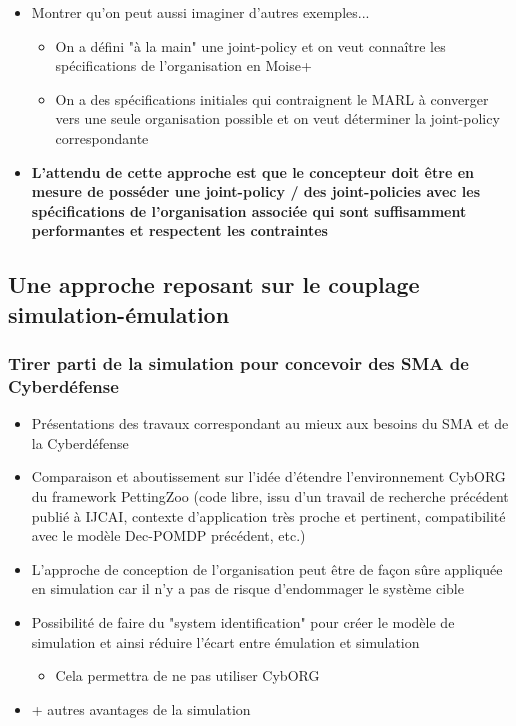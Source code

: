 \begin{itemize}
\begin{itemize}
\begin{itemize}
                    \end{itemize}
          \end{itemize}
    \item Montrer qu'on peut aussi imaginer d'autres exemples...
          \begin{itemize}
              \item On a défini "à la main" une joint-policy et on veut connaître les spécifications de l'organisation en Moise+
              \item On a des spécifications initiales qui contraignent le MARL à converger vers une seule organisation possible et on veut déterminer la joint-policy correspondante
          \end{itemize}
    \item \textbf{L'attendu de cette approche est que le concepteur doit être en mesure de posséder une joint-policy / des joint-policies avec les spécifications de l'organisation associée qui sont suffisamment performantes et respectent les contraintes}
\end{itemize}

\subsection{Une approche reposant sur le couplage simulation-émulation}

\subsubsection{Tirer parti de la simulation pour concevoir des SMA de Cyberdéfense}
\begin{itemize}

    \item Présentations des travaux correspondant au mieux aux besoins du SMA et de la Cyberdéfense
    \item Comparaison et aboutissement sur l'idée d'étendre l'environnement CybORG du framework PettingZoo (code libre, issu d'un travail de recherche précédent publié à IJCAI, contexte d'application très proche et pertinent, compatibilité avec le modèle Dec-POMDP précédent, etc.)
    \item L'approche de conception de l'organisation peut être de façon sûre appliquée en simulation car il n'y a pas de risque d'endommager le système cible
    \item Possibilité de faire du "system identification" pour créer le modèle de simulation et ainsi réduire l'écart entre émulation et simulation
          \begin{itemize}
              \item Cela permettra de ne pas utiliser CybORG
          \end{itemize}
    \item + autres avantages de la simulation
\end{itemize}

